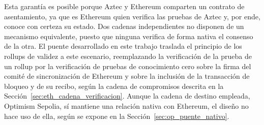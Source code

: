 Esta garantía es posible porque Aztec y Ethereum comparten un contrato de asentamiento, ya que es
Ethereum quien verifica las pruebas de Aztec y, por ende, conoce con certeza su estado. Dos
cadenas independientes no disponen de un mecanismo equivalente, puesto que ninguna verifica de
forma nativa el consenso de la otra. El puente desarrollado en este trabajo traslada el
principio de los rollups de validez a este escenario, reemplazando la verificación de la prueba
de un rollup por la verificación de pruebas de conocimiento cero sobre la firma del comité de
sincronización de Ethereum y sobre la inclusión de la transacción de bloqueo y de su recibo,
según la cadena de compromisos descrita en la Sección~\ref{sec:eth_cadena_verificacion}. Aunque
la cadena de destino empleada, Optimism Sepolia, sí mantiene una relación nativa con
Ethereum, el diseño no hace uso de ella, según se expone en la
Sección~\ref{sec:op_puente_nativo}.
